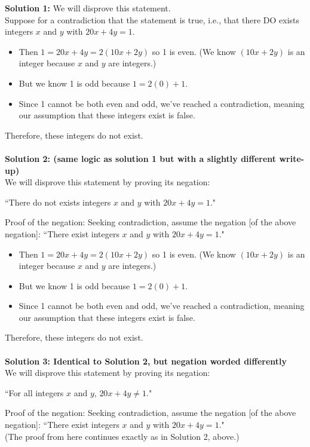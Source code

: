 \documentclass[12pt]{exam}
\begin{document}
\begin{solution}
\textbf{Solution 1:} We will disprove this statement.\\ 
Suppose for a contradiction that the statement is true, i.e., that there DO exists  integers $x$ and $y$ with $20x + 4y = 1$. 
\begin{itemize}
    \item Then $1 = 20x + 4y = 2(10x+2y)$ so 1 is even. (We know $(10x+2y)$ is an integer because $x$ and $y$ are integers.)
    \item But we know 1 is odd because $1 = 2(0)+1$. 
    \item Since 1 cannot be both even and odd, we've reached a contradiction, meaning our assumption that these integers exist is false.
\end{itemize} 
Therefore, these integers do not exist.\\\\

\textbf{Solution 2: (same logic as solution 1 but with a slightly different write-up)}\\
We will disprove this statement by proving its negation: 
\begin{center} ``There do not exists integers $x$ and $y$ with $20x + 4y = 1$." \end{center}
Proof of the negation: Seeking contradiction, assume the negation [of the above negation]: ``There exist integers $x$ and $y$ with $20x + 4y = 1$."
\begin{itemize}
    \item Then $1 = 20x + 4y = 2(10x+2y)$ so 1 is even. (We know $(10x+2y)$ is an integer because $x$ and $y$ are integers.)
    \item But we know 1 is odd because $1 = 2(0)+1$. 
    \item Since 1 cannot be both even and odd, we've reached a contradiction, meaning our assumption that these integers exist is false.
\end{itemize} 
Therefore, these integers do not exist.\\\\

\textbf{Solution 3: Identical to Solution 2, but negation worded differently}\\
We will disprove this statement by proving its negation: 
\begin{center} ``For all integers $x$ and $y$,  $20x + 4y \neq 1$." \end{center}
Proof of the negation: Seeking contradiction, assume the negation [of the above negation]: ``There exist integers $x$ and $y$ with $20x + 4y = 1$." \\
 (The proof from here continues exactly as in Solution 2, above.)\\



\end{solution}
\end{document}
